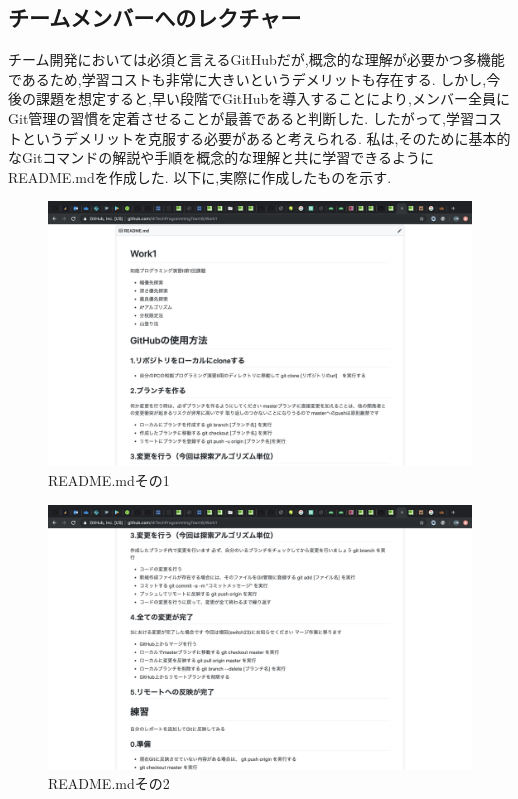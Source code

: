 ﻿\documentclass[uplatex,12pt]{jsarticle}
\begin{document}
\newpage


\subsection{チームメンバーへのレクチャー}
チーム開発においては必須と言えるGitHubだが,概念的な理解が必要かつ多機能であるため,学習コストも非常に大きいというデメリットも存在する.
しかし,今後の課題を想定すると,早い段階でGitHubを導入することにより,メンバー全員にGit管理の習慣を定着させることが最善であると判断した.
したがって,学習コストというデメリットを克服する必要があると考えられる.
私は,そのために基本的なGitコマンドの解説や手順を概念的な理解と共に学習できるようにREADME.mdを作成した.
以下に,実際に作成したものを示す.

\begin{figure}[!hbt]
  \centering
  \includegraphics[scale=0.20]{git_image/read_me_1.png}
  \caption{README.mdその1}
\end{figure}

\begin{figure}[!hbt]
  \centering
  \includegraphics[scale=0.20]{git_image/read_me_2.png}
  \caption{README.mdその2}
\end{figure}
\end{document}
